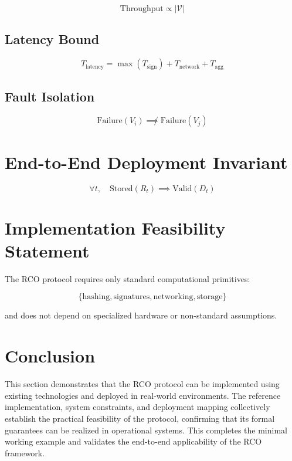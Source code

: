 \begin{equation}
\text{Throughput} \propto |\mathcal{V}|
\end{equation}

\subsection{Latency Bound}

\begin{equation}
T_{\text{latency}} = \max(T_{\text{sign}}) + T_{\text{network}} + T_{\text{agg}}
\end{equation}

\subsection{Fault Isolation}

\begin{equation}
\text{Failure}(V_i) \not\implies \text{Failure}(V_j)
\end{equation}

\section{End-to-End Deployment Invariant}

\begin{equation}
\forall t, \quad \text{Stored}(R_t) \implies \text{Valid}(D_t)
\end{equation}

\section{Implementation Feasibility Statement}

The RCO protocol requires only standard computational primitives:

\begin{equation}
\{\text{hashing}, \text{signatures}, \text{networking}, \text{storage}\}
\end{equation}

and does not depend on specialized hardware or non-standard assumptions.

\section{Conclusion}

This section demonstrates that the RCO protocol can be implemented using existing technologies and deployed in real-world environments. The reference implementation, system constraints, and deployment mapping collectively establish the practical feasibility of the protocol, confirming that its formal guarantees can be realized in operational systems. This completes the minimal working example and validates the end-to-end applicability of the RCO framework.